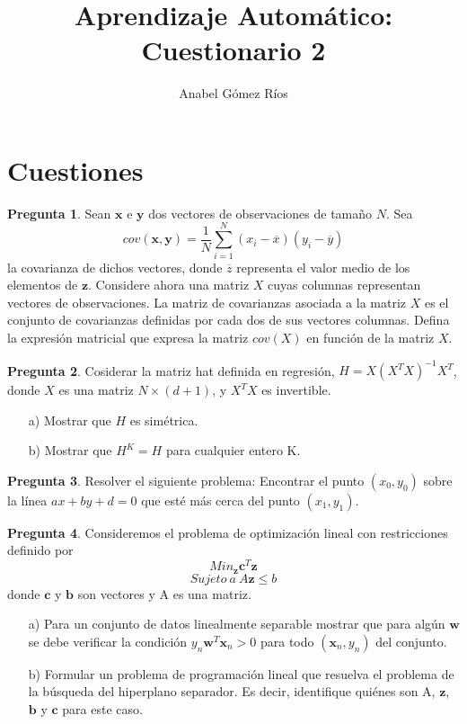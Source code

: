 \documentclass[12pt]{article}
\title{Aprendizaje Automático: Cuestionario 2}
\author{Anabel G\'omez R\'ios}
\theoremstyle{definition}
\begin{document}
\maketitle

\newtheorem{pregunta}{Pregunta}

\section{Cuestiones}
\begin{pregunta}
Sean $\mathbf{x}$ e $\mathbf{y}$ dos vectores de observaciones de tamaño $N$. Sea
\[
	cov(\mathbf{x},\mathbf{y})=\frac{1}{N}\sum_{i=1}^N(x_i-\overline{x})(y_i - \overline{y})
\]
la covarianza de dichos vectores, donde $\overline{z}$ representa el valor medio de los elementos de $\mathbf{z}$. Considere ahora una matriz $X$ cuyas columnas representan vectores de observaciones. La matriz de covarianzas asociada a la matriz $X$ es el conjunto de covarianzas definidas por cada dos de sus vectores columnas. Defina la expresión matricial que expresa la matriz $cov(X)$ en función de la matriz $X$.\\


\end{pregunta}

\begin{pregunta}
Cosiderar la matriz hat definida en regresión, $H=X(X^TX)^{-1}X^T$, donde $X$ es una matriz $N \times (d+1)$, y $X^TX$ es invertible.
\begin{enumerate}
\item[a)] Mostrar que $H$ es simétrica.
\item[b)] Mostrar que $H^K=H$ para cualquier entero K.
\end{enumerate}

\end{pregunta}

\begin{pregunta}
Resolver el siguiente problema: Encontrar el punto $(x_0,y_0)$ sobre la línea $ax+by+d=0$ que esté más cerca del punto $(x_1,y_1)$.\\


\end{pregunta}

\begin{pregunta}
Consideremos el problema de optimización lineal con restricciones definido por 
\[	Min_{\mathbf{z}}\mathbf{c}^T\mathbf{z}	\]
\[	Sujeto\ a\ A\mathbf{z} \leq b	\]
donde $\mathbf{c}$ y $\mathbf{b}$ son vectores y A es una matriz.
\begin{enumerate}
\item[a)] Para un conjunto de datos linealmente separable mostrar que para algún $\mathbf{w}$ se debe verificar la condición $y_n\mathbf{w}^T\mathbf{x}_n > 0$ para todo $(\mathbf{x}_n, y_n)$ del conjunto.
\item[b)] Formular un problema de programación lineal que resuelva el problema de la búsqueda del hiperplano separador. Es decir, identifique quiénes son A, $\mathbf{z}$, $\mathbf{b}$ y $\mathbf{c}$ para este caso.
\end{enumerate}

\end{pregunta}
\end{document}
